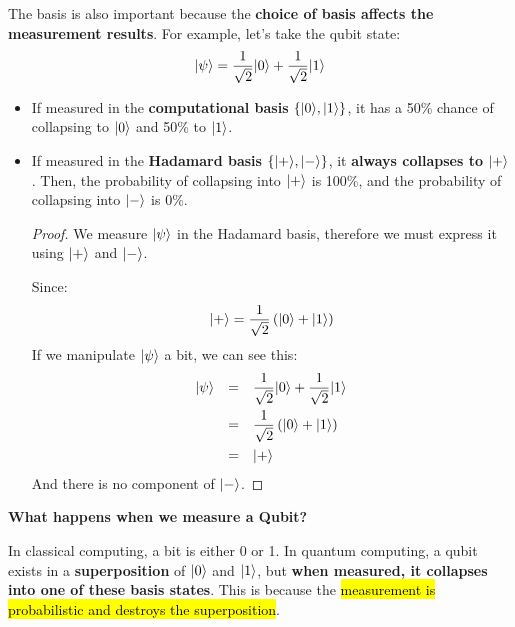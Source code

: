 \highspace
The basis is also important because the \textbf{choice of basis affects the measurement results}. For example, let's take the qubit state:
\begin{equation*}
    | \psi \rangle = \dfrac{1}{\sqrt{2}} | 0 \rangle + \dfrac{1}{\sqrt{2}} | 1 \rangle
\end{equation*}
\begin{itemize}
    \item If measured in the \textbf{computational basis} $\left\{| 0 \rangle, | 1 \rangle\right\}$, it has a 50\% chance of collapsing to $| 0 \rangle$ and 50\% to $| 1 \rangle$.
    \item If measured in the \textbf{Hadamard basis} $\left\{| + \rangle, | - \rangle\right\}$, it \textbf{always collapses to} $| + \rangle$. Then, the probability of collapsing into $| + \rangle$ is 100\%, and the probability of collapsing into $| - \rangle$ is 0\%.
    \begin{proof}
        We measure $| \psi \rangle$ in the Hadamard basis, therefore we must express it using $| + \rangle$ and $| - \rangle$.

        Since:
        \begin{equation*}
            | + \rangle = \dfrac{1}{\sqrt{2}} \left(| 0 \rangle + | 1 \rangle\right)
        \end{equation*}
        If we manipulate $| \psi \rangle$ a bit, we can see this:
        \begin{equation*}
            \begin{array}{rcl}
                | \psi \rangle &=& \dfrac{1}{\sqrt{2}} | 0 \rangle + \dfrac{1}{\sqrt{2}} | 1 \rangle \\ [1em]
                &=& \dfrac{1}{\sqrt{2}} \left(| 0 \rangle + | 1 \rangle\right) \\ [1em]
                &=& | + \rangle
            \end{array}
        \end{equation*}
        And there is no component of $| - \rangle$.
    \end{proof}
\end{itemize}

\newpage

\begin{flushleft}
    \textcolor{Green3}{ \textbf{What happens when we measure a Qubit?}}
\end{flushleft}
In classical computing, a bit is either 0 or 1. In quantum computing, a qubit exists in a \textbf{superposition} of $| 0 \rangle$ and $| 1 \rangle$, but \textbf{when measured, it collapses into one of these basis states}. This is because the \hl{measurement is probabilistic and destroys the superposition}.

